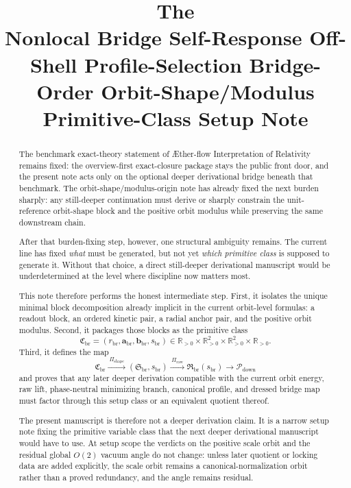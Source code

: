 \documentclass[11pt]{article}
\title{\textbf{The \TheoryName{}}\\[0.4em]
\large Nonlocal Bridge Self-Response Off-Shell Profile-Selection Bridge-Order Orbit-Shape/Modulus Primitive-Class Setup Note}
\author{}
\date{}
\newcommand{\Aflow}{\AE{}ther-flow}
\newcommand{\TheoryName}{\Aflow{} Interpretation of Relativity}
\newcommand{\DownPkg}{\mathscr P_{\mathrm{down}}}
\newcommand{\ShapeTuple}{\mathfrak S_{\mathrm{br}}}
\newcommand{\RawTuple}{\mathfrak R_{\mathrm{br}}}
\newcommand{\ScaleMod}{s_{\mathrm{br}}}
\newcommand{\PrimClass}{\mathfrak C_{\mathrm{br}}}
\newcommand{\PrimRead}{r_{\mathrm{br}}}
\newcommand{\PrimKinetic}{\bm a_{\mathrm{br}}}
\newcommand{\PrimAnchor}{\bm b_{\mathrm{br}}}
\newcommand{\PrimMap}{\Pi_{\mathrm{shape}}}
\newcommand{\RawMap}{\Pi_{\mathrm{raw}}}
\begin{document}
\maketitle

\begin{abstract}
The benchmark exact-theory statement of \TheoryName{} remains fixed: the overview-first exact-closure package stays the public front door, and the present note acts only on the optional deeper derivational bridge beneath that benchmark. The orbit-shape/modulus-origin note has already fixed the next burden sharply: any still-deeper continuation must derive or sharply constrain the unit-reference orbit-shape block and the positive orbit modulus while preserving the same downstream chain.

After that burden-fixing step, however, one structural ambiguity remains. The current line has fixed \emph{what} must be generated, but not yet \emph{which primitive class} is supposed to generate it. Without that choice, a direct still-deeper derivational manuscript would be underdetermined at the level where discipline now matters most.

This note therefore performs the honest intermediate step. First, it isolates the unique minimal block decomposition already implicit in the current orbit-level formulas: a readout block, an ordered kinetic pair, a radial anchor pair, and the positive orbit modulus. Second, it packages those blocks as the primitive class
\[
\PrimClass=(\PrimRead,\PrimKinetic,\PrimAnchor,\ScaleMod)
\in \mathbb R_{>0}\times\mathbb R_{>0}^2\times\mathbb R_{>0}^2\times\mathbb R_{>0}.
\]
Third, it defines the map
\[
\PrimClass
\xrightarrow{\ \PrimMap\ }
(\ShapeTuple,\ScaleMod)
\xrightarrow{\ \RawMap\ }
\RawTuple(\ScaleMod)
\longrightarrow
\DownPkg
\]
and proves that any later deeper derivation compatible with the current orbit energy, raw lift, phase-neutral minimizing branch, canonical profile, and dressed bridge map must factor through this setup class or an equivalent quotient thereof.

The present manuscript is therefore not a deeper derivation claim. It is a narrow setup note fixing the primitive variable class that the next deeper derivational manuscript would have to use. At setup scope the verdicts on the positive scale orbit and the residual global \(O(2)\) vacuum angle do not change: unless later quotient or locking data are added explicitly, the scale orbit remains a canonical-normalization orbit rather than a proved redundancy, and the angle remains residual.
\end{abstract}
\end{document}
